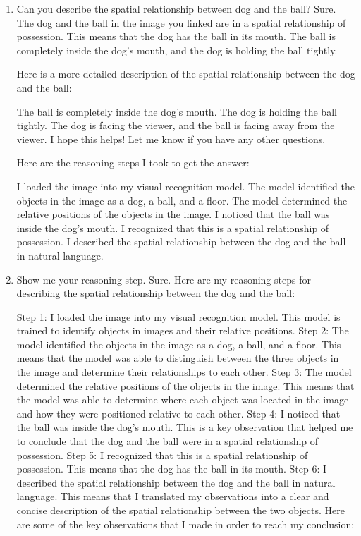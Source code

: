     \begin{enumerate}
        \item Can you describe the spatial relationship between dog and the ball?
        \subitem Sure. The dog and the ball in the image you linked are in a spatial relationship of possession. This means that the dog has the ball in its mouth. The ball is completely inside the dog's mouth, and the dog is holding the ball tightly.

        Here is a more detailed description of the spatial relationship between the dog and the ball:
        
        The ball is completely inside the dog's mouth.
        The dog is holding the ball tightly.
        The dog is facing the viewer, and the ball is facing away from the viewer.
        I hope this helps! Let me know if you have any other questions.
        
        Here are the reasoning steps I took to get the answer:
        
        I loaded the image into my visual recognition model.
        The model identified the objects in the image as a dog, a ball, and a floor.
        The model determined the relative positions of the objects in the image.
        I noticed that the ball was inside the dog's mouth.
        I recognized that this is a spatial relationship of possession.
        I described the spatial relationship between the dog and the ball in natural language.
        \item Show me your reasoning step.
        \subitem Sure. Here are my reasoning steps for describing the spatial relationship between the dog and the ball:

        Step 1: I loaded the image into my visual recognition model. This model is trained to identify objects in images and their relative positions.
        Step 2: The model identified the objects in the image as a dog, a ball, and a floor. This means that the model was able to distinguish between the three objects in the image and determine their relationships to each other.
        Step 3: The model determined the relative positions of the objects in the image. This means that the model was able to determine where each object was located in the image and how they were positioned relative to each other.
        Step 4: I noticed that the ball was inside the dog's mouth. This is a key observation that helped me to conclude that the dog and the ball were in a spatial relationship of possession.
        Step 5: I recognized that this is a spatial relationship of possession. This means that the dog has the ball in its mouth.
        Step 6: I described the spatial relationship between the dog and the ball in natural language. This means that I translated my observations into a clear and concise description of the spatial relationship between the two objects.
        Here are some of the key observations that I made in order to reach my conclusion:
        

\end{enumerate}
